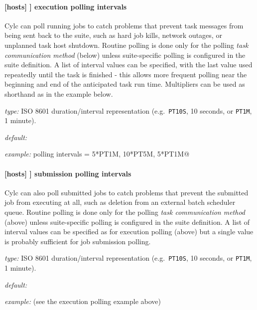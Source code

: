 \paragraph[execution polling intervals]{[hosts] \textrightarrow [[HOST]] \textrightarrow execution polling intervals}
\label{execution_polling}

Cylc can poll running jobs to catch problems that prevent task messages
from being sent back to the suite, such as hard job kills, network
outages, or unplanned task host shutdown. Routine polling is done only
for the polling {\em task communication method} (below) unless
suite-specific polling is configured in the suite definition.
A list of interval values can be specified, with the last value used
repeatedly until the task is finished - this allows more frequent
polling near the beginning and end of the anticipated task run time.
Multipliers can be used as shorthand as in the example below.

\begin{myitemize}
\item {\em type:} ISO 8601 duration/interval representation (e.g.\ 
\lstinline=PT10S=, 10 seconds, or \lstinline=PT1M=, 1 minute).
\item {\em default:}
\item {\em example:} \lstinline@execution polling intervals = 5*PT1M, 10*PT5M, 5*PT1M@
\end{myitemize}


\paragraph[submission polling intervals]{[hosts] \textrightarrow [[HOST]] \textrightarrow submission polling intervals}
\label{submission_polling}

Cylc can also poll submitted jobs to catch problems that prevent the
submitted job from executing at all, such as deletion from an external
batch scheduler queue. Routine polling is done only for the polling {\em
task communication method} (above) unless suite-specific polling
is configured in the suite definition. A list of interval
values can be specified as for execution polling (above) but a single
value is probably sufficient for job submission polling.

\begin{myitemize}
\item {\em type:} ISO 8601 duration/interval representation (e.g.\ 
\lstinline=PT10S=, 10 seconds, or \lstinline=PT1M=, 1 minute).
\item {\em default:}
\item {\em example:} (see the execution polling example above)
\end{myitemize}

